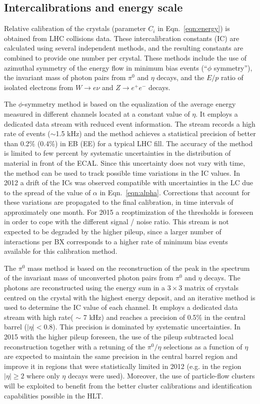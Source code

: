 \documentclass[journal]{IEEEtran}
\begin{document}
\subsection{Intercalibrations and energy scale}
\label{sec:intercalibrations}
Relative calibration of the crystals (parameter $C_i$ in Eqn.~\ref{eqn:energy}) is obtained from LHC collisions data. These intercalibration constants (IC) are calculated using several independent methods, and the resulting constants are combined to provide one number per crystal. These methods include the use of azimuthal symmetry of the energy flow in minimum bias events (``$\phi$ symmetry''), the invariant mass of photon pairs from $\pi^0$ and $\eta$ decays, and the $E/p$ ratio of isolated electrons from $W\to e\nu$ and $Z\to e^+e^-$ decays.

The $\phi$-symmetry method is based on the equalization of the average energy measured in different channels located at a constant value of $\eta$. It employs a dedicated data stream with reduced event information. The stream records a high rate of events ($\sim$1.5 kHz) and the method achieves a statistical precision of better than 0.2\% (0.4\%) in EB (EE) for a typical LHC fill. The accuracy of the method is limited to few percent by systematic uncertainties in the distribution of material in front of the ECAL. Since this uncertainty does not vary with time, the method can be used to track possible time variations in the IC values. In 2012 a drift of the ICs was observed compatible with uncertainties in the LC due to the spread of the value of $\alpha$ in Eqn.~\ref{eqn:alpha}. Corrections that account for these variations are propagated to the final calibration, in time intervals of approximately one month. For 2015 a reoptimization of the thresholds is foreseen in order to cope with the different signal / noise ratio. This stream is not expected to be degraded by the higher pileup, since a larger number of interactions per BX corresponds to a higher rate of minimum bias events available for this calibration method.

The $\pi^0$ mass method is based on the reconstruction of the peak in the spectrum of the invariant mass of unconverted photon pairs from $\pi^0$ and $\eta$ decays. The photons are reconstructed using the energy sum in a $3 \times 3$ matrix of crystals centred on the crystal with the highest energy deposit, and an iterative method is used to determine the IC value of each channel. It employs a dedicated data stream with high rate( $\sim$ 7 kHz) and reaches a precision of 0.5\% in the central barrel ($\vert\eta\vert<0.8$). This precision is dominated by systematic uncertainties. In 2015 with the higher pileup foreseen, the use of the pileup subtracted local reconstruction together with a retuning of the $\pi^0 / \eta$ selections as a function of $\eta$ are expected to maintain the same precision in the central barrel region and improve it in regions that were statistically limited in 2012 (e.g. in the region $\vert\eta\vert\ge2$ where only $\eta$ decays were used). Moreover, the use of particle-flow clusters \cite{CMS:2010eua} will be exploited to benefit from the better cluster calibrations and identification capabilities possible in the HLT.
\end{document}

